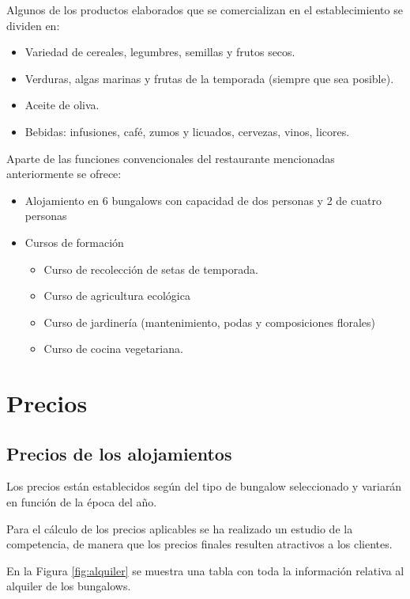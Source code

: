 Algunos de los productos elaborados que se comercializan en el establecimiento se dividen en:

\begin{itemize}
\item Variedad de cereales, legumbres, semillas y frutos secos. 
\item Verduras, algas marinas y frutas de la temporada (siempre que sea posible). 
\item Aceite de oliva.
\item Bebidas: infusiones, café, zumos y licuados, cervezas, vinos, licores.
\end{itemize}

Aparte de las funciones convencionales del restaurante mencionadas anteriormente se ofrece:

\begin{itemize}
\item Alojamiento en 6 bungalows con capacidad de dos personas y 2 de cuatro personas
\item Cursos de formación
\begin{itemize}
\item Curso de recolección de setas de temporada.
\item Curso de agricultura ecológica
\item Curso de jardinería (mantenimiento, podas y composiciones florales)
\item Curso de cocina vegetariana.
\end{itemize}
\end{itemize}

\section{Precios}
\label{sec:precios}

\subsection{Precios de los alojamientos}
\label{sec:alojamiento}

Los precios están establecidos según del tipo de bungalow seleccionado y variarán en función de la época del año. 

Para el cálculo de los precios aplicables se ha realizado un estudio de la competencia, de manera que los precios finales resulten atractivos a los clientes.

En la Figura \ref{fig:alquiler} se muestra una tabla con toda la información relativa al alquiler de los bungalows.


